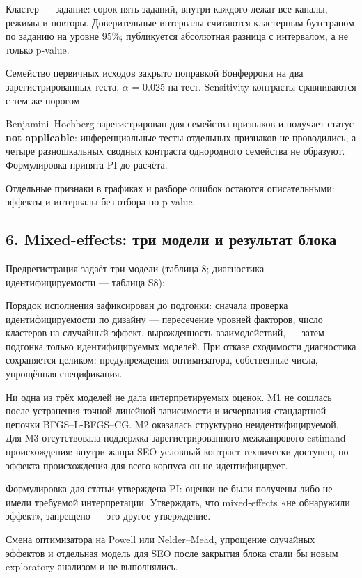 \documentclass[11pt,a4paper]{article}
\renewcommand{\_}{\textunderscore\allowbreak}
\begin{document}
Кластер — задание: сорок пять заданий, внутри каждого лежат все каналы, режимы и
повторы. Доверительные интервалы считаются кластерным бутстрапом по заданию
на уровне 95\%; публикуется абсолютная разница с интервалом, а не только
p-value.

Семейство первичных исходов закрыто поправкой Бонферрони на два зарегистрированных
теста, $\alpha$ = 0.025 на тест. Sensitivity-контрасты сравниваются с тем же порогом.

Benjamini–Hochberg зарегистрирован для семейства признаков и получает статус \textbf{not
applicable}: инференциальные тесты отдельных признаков не проводились, а четыре
разношкальных сводных контраста однородного семейства не образуют. Формулировка
принята PI до расчёта.

Отдельные признаки в графиках и разборе ошибок остаются описательными: эффекты и
интервалы без отбора по p-value.

\subsection{6. Mixed-effects: три модели и результат блока}

Предрегистрация задаёт три модели (таблица 8; диагностика идентифицируемости —
таблица S8):

\setcounter{table}{7}


Порядок исполнения зафиксирован до подгонки: сначала проверка идентифицируемости
по дизайну — пересечение уровней факторов, число кластеров на случайный эффект,
вырожденность взаимодействий, — затем подгонка только идентифицируемых моделей.
При отказе сходимости диагностика сохраняется целиком: предупреждения
оптимизатора, собственные числа, упрощённая спецификация.

Ни одна из трёх моделей не дала интерпретируемых оценок. M1 не сошлась после
устранения точной линейной зависимости и исчерпания стандартной цепочки
BFGS–L-BFGS–CG. M2 оказалась структурно неидентифицируемой. Для M3 отсутствовала
поддержка зарегистрированного межжанрового estimand происхождения: внутри жанра
SEO условный контраст технически доступен, но эффекта происхождения для всего
корпуса он не идентифицирует.

Формулировка для статьи утверждена PI: оценки не были получены либо не имели
требуемой интерпретации. Утверждать, что mixed-effects «не обнаружили эффект»,
запрещено — это другое утверждение.

Смена оптимизатора на Powell или Nelder–Mead, упрощение случайных эффектов и
отдельная модель для SEO после закрытия блока стали бы новым exploratory-анализом
и не выполнялись.
\end{document}
